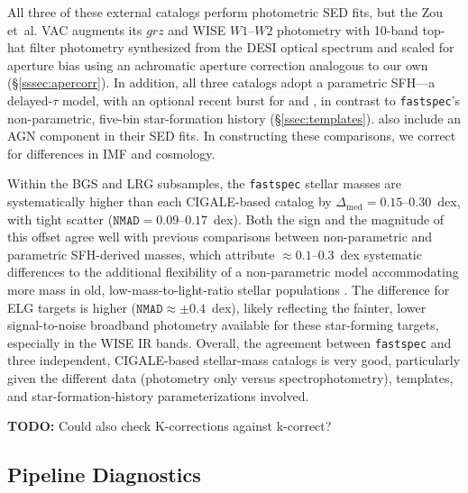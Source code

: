 \documentclass[modern,linenumbers]{aastex701}
\newcommand{\todo}[1]{{\color{red}\textbf{TODO:} #1}}
\newcommand{\fastspec}{\texttt{fastspec}}
\begin{document}

All three of these external catalogs perform photometric SED fits, but
the Zou et~al. VAC augments its $grz$ and WISE $W1$--$W2$ photometry
with 10-band top-hat filter photometry synthesized from the DESI
optical spectrum and scaled for aperture bias using an achromatic
aperture correction analogous to our own (\S\ref{sssec:apercorr}). In
addition, all three catalogs adopt a parametric SFH---a delayed-$\tau$
model, with an optional recent burst for \citet{siudek25a} and
\citet{salim18a}, in contrast to \fastspec{}'s non-parametric,
five-bin star-formation history
(\S\ref{ssec:templates}). \citet{siudek25a} also include an AGN
component \citep{fritz06a} in their SED fits. In constructing these
comparisons, we correct for differences in IMF and cosmology.

Within the BGS and LRG subsamples, the \fastspec{} stellar masses are
systematically higher than each CIGALE-based catalog by
$\Delta_\mathrm{med}=0.15$--$0.30$~dex, with tight scatter
($\mathtt{NMAD}=0.09$--$0.17$~dex). Both the sign and the magnitude of
this offset agree well with previous comparisons between
non-parametric and parametric SFH-derived masses, which attribute
$\approx0.1$--$0.3$~dex systematic differences to the additional
flexibility of a non-parametric model accommodating more mass in old,
low-mass-to-light-ratio stellar populations \citep{leja19b, leja20a,
  lower20a}. The difference for ELG targets is higher ($\mathtt{NMAD}
\approx \pm0.4$~dex), likely reflecting the fainter, lower
signal-to-noise broadband photometry available for these star-forming
targets, especially in the WISE IR bands. Overall, the agreement
between \fastspec{} and three independent, CIGALE-based stellar-mass
catalogs is very good, particularly given the different data
(photometry only versus spectrophotometry), templates, and
star-formation-history parameterizations involved.

\todo{Could also check K-corrections against k-correct?}

\subsection{Pipeline Diagnostics}
\label{ssec:diagnostics}
\end{document}
